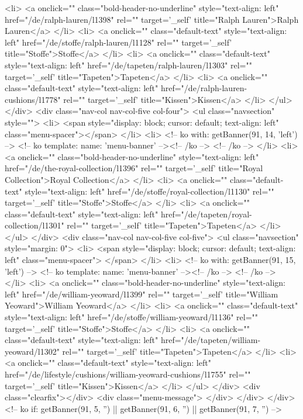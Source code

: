 <li>
<a onclick="" class="bold-header-no-underline" style="text-align: left" href="/de/ralph-lauren/l1398" rel="" target='_self' title="Ralph Lauren">Ralph Lauren</a>
</li>
<li>
<a onclick="" class="default-text" style="text-align: left" href="/de/stoffe/ralph-lauren/l1128" rel="" target='_self' title="Stoffe">Stoffe</a>
</li>
<li>
<a onclick="" class="default-text" style="text-align: left" href="/de/tapeten/ralph-lauren/l1303" rel="" target='_self' title="Tapeten">Tapeten</a>
</li>
<li>
<a onclick="" class="default-text" style="text-align: left" href="/de/ralph-lauren-cushions/l1778" rel="" target='_self' title="Kissen">Kissen</a>
</li>
</ul>
</div>
<div class="nav-col nav-col-five col-four">
<ul class="navsection" style="">
<li>
<span style="display: block; cursor: default; text-align: left" class="menu-spacer"></span>
</li>
<li>
<!-- ko with: getBanner(91, 14, 'left') -->
<!-- ko template: { name: 'menu-banner' } --><!-- /ko -->
<!-- /ko -->
</li>
<li>
<a onclick="" class="bold-header-no-underline" style="text-align: left" href="/de/the-royal-collection/l1396" rel="" target='_self' title="Royal Collection">Royal Collection</a>
</li>
<li>
<a onclick="" class="default-text" style="text-align: left" href="/de/stoffe/royal-collection/l1130" rel="" target='_self' title="Stoffe">Stoffe</a>
</li>
<li>
<a onclick="" class="default-text" style="text-align: left" href="/de/tapeten/royal-collection/l1301" rel="" target='_self' title="Tapeten">Tapeten</a>
</li>
</ul>
</div>
<div class="nav-col nav-col-five col-five">
<ul class="navsection" style="margin: 0">
<li>
<span style="display: block; cursor: default; text-align: left" class="menu-spacer"> </span>
</li>
<li>
<!-- ko with: getBanner(91, 15, 'left') -->
<!-- ko template: { name: 'menu-banner' } --><!-- /ko -->
<!-- /ko -->
</li>
<li>
<a onclick="" class="bold-header-no-underline" style="text-align: left" href="/de/william-yeoward/l1399" rel="" target='_self' title="William Yeoward">William Yeoward</a>
</li>
<li>
<a onclick="" class="default-text" style="text-align: left" href="/de/stoffe/william-yeoward/l1136" rel="" target='_self' title="Stoffe">Stoffe</a>
</li>
<li>
<a onclick="" class="default-text" style="text-align: left" href="/de/tapeten/william-yeoward/l1302" rel="" target='_self' title="Tapeten">Tapeten</a>
</li>
<li>
<a onclick="" class="default-text" style="text-align: left" href="/de/lifestyle/cushions/william-yeoward-cushions/l1755" rel="" target='_self' title="Kissen">Kissen</a>
</li>
</ul>
</div>
<div class="clearfix"></div>
<div class="menu-message">
</div>
</div>
</div>
<!-- ko if: getBanner(91, 5, '') || getBanner(91, 6, '') || getBanner(91, 7, '') -->
